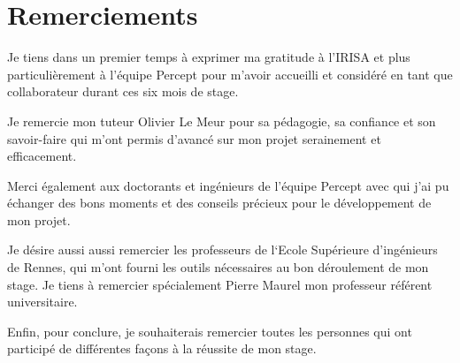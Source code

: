 \chapter*{Remerciements}
\par
    Je tiens dans un premier temps à exprimer ma gratitude à l'IRISA et plus 
    particulièrement à l'équipe Percept pour m'avoir accueilli et considéré en 
    tant que collaborateur durant ces six mois de stage.

\par
    Je remercie mon tuteur Olivier Le Meur pour sa pédagogie, sa confiance et 
    son savoir-faire qui m'ont permis d'avancé sur mon projet serainement et 
    efficacement.

\par
    Merci également aux doctorants et ingénieurs de l'équipe Percept avec qui 
    j'ai pu échanger des bons moments et des conseils précieux pour le 
    développement de mon projet.
    
\par
    Je désire aussi aussi remercier les professeurs de l‘Ecole Supérieure 
    d'ingénieurs de Rennes, qui m’ont fourni les outils nécessaires au bon 
    déroulement de mon stage. Je tiens à remercier spécialement Pierre Maurel 
    mon professeur référent universitaire.

\par
    Enfin, pour conclure, je souhaiterais remercier toutes les personnes qui ont 
    participé de différentes façons à la réussite de mon stage.